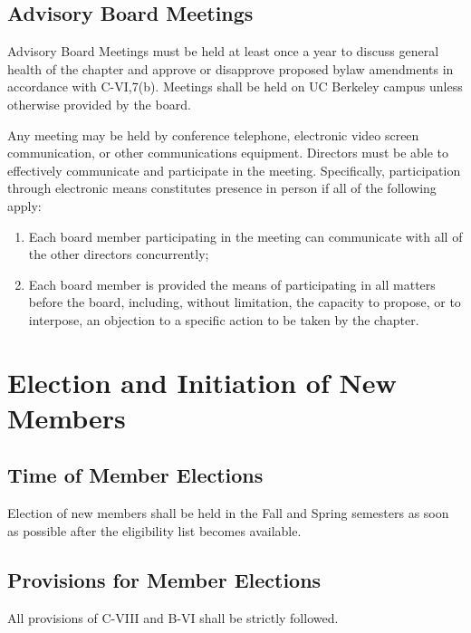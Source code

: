 \documentclass{article}
\begin{document}
	\subsection{Advisory Board Meetings}
	Advisory Board Meetings must be held at least once a year to discuss general health of the chapter and approve or disapprove proposed bylaw amendments in accordance with C-VI,7(b). Meetings shall be held on UC Berkeley campus unless otherwise provided by the board.
	
	Any meeting may be held by conference telephone, electronic video screen communication, or other communications equipment. Directors must be able to effectively communicate and participate in the meeting. Specifically, participation through electronic means constitutes presence in person if all of the following apply:
	\begin{enumerate}[\indent (a)]
		\item Each board member participating in the meeting can communicate with all of the other directors concurrently;
		\item	Each board member is provided the means of participating in all matters before the board, including, without limitation, the capacity to propose, or to interpose, an objection to a specific action to be taken by the chapter.
	\end{enumerate}
	

	\section{Election and Initiation of New Members}
	\subsection{Time of Member Elections}
	Election of new members shall be held in the Fall and Spring semesters as soon as possible after the eligibility list becomes available.
	\subsection{Provisions for Member Elections}
	All provisions of C-VIII and B-VI shall be strictly followed.
\end{document}
